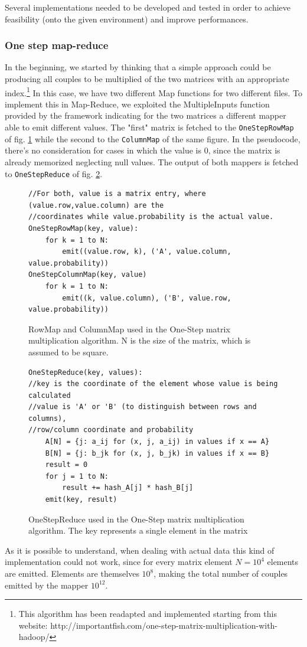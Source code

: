 Several implementations needed to be developed and tested in order to
achieve feasibility (onto the given environment) and improve performances.

\subsubsection{One step map-reduce}
In the beginning, we started by thinking that a simple approach could be producing all
couples to be multiplied of the two matrices with an appropriate index.\footnote{This algorithm
has been readapted and implemented starting from this website: http://importantfish.com/one-step-matrix-multiplication-with-hadoop/}
In this case, we have two different Map functions for two different files. To implement this in Map-Reduce, we exploited
the MultipleInputs function provided by the framework indicating for the two matrices a different mapper able
to emit different values.
The "first" matrix is fetched to the \texttt{OneStepRowMap} of fig. \ref{fig:onestep} while the second to the \texttt{ColumnMap} of the same figure. In the pseudocode, there's no consideration for cases in which the value is 0, since the
matrix is already memorized neglecting null values.
The output of both mappers is fetched to \texttt{OneStepReduce} of fig. \ref{fig:onestepReduce}.
\begin{figure}[H]
\begin{verbatim}
//For both, value is a matrix entry, where (value.row,value.column) are the
//coordinates while value.probability is the actual value.
OneStepRowMap(key, value):
    for k = 1 to N:
        emit((value.row, k), ('A', value.column, value.probability))
OneStepColumnMap(key, value)
    for k = 1 to N:
        emit((k, value.column), ('B', value.row, value.probability))
\end{verbatim}
\caption{RowMap and ColumnMap used in the One-Step matrix multiplication algorithm. N is the size of the matrix, which is assumed to be square.}
\label{fig:onestep}
\end{figure}

\begin{figure}[H]
\begin{verbatim}
OneStepReduce(key, values):
//key is the coordinate of the element whose value is being calculated
//value is 'A' or 'B' (to distinguish between rows and columns), 
//row/column coordinate and probability
    A[N] = {j: a_ij for (x, j, a_ij) in values if x == A}
    B[N] = {j: b_jk for (x, j, b_jk) in values if x == B}
    result = 0
    for j = 1 to N:
        result += hash_A[j] * hash_B[j]
    emit(key, result)
\end{verbatim}
\caption{OneStepReduce used in the One-Step matrix multiplication algorithm. The key represents a single element in the matrix}
\label{fig:onestepReduce}
\end{figure}
As it is possible to understand, when dealing with actual data this kind of implementation could not
work, since for every matrix element $N=10^4$ elements are emitted. 
Elements are themselves $10^8$, making the total number of couples emitted by the mapper $10^{12}$.

